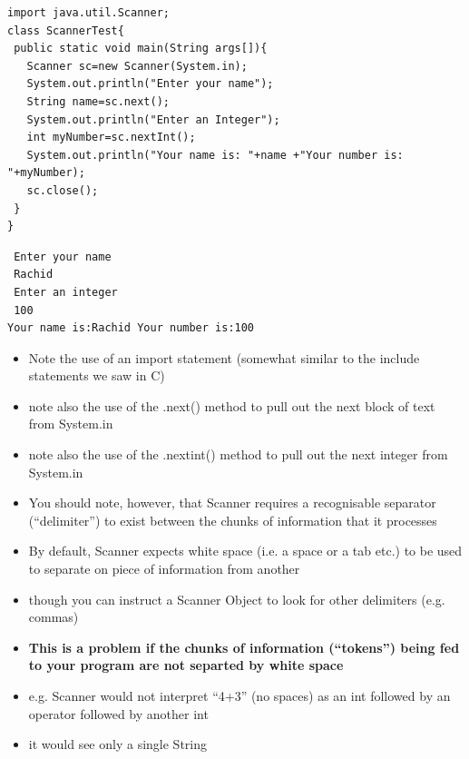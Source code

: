 \documentclass{beamer}
\begin{document}
\begin{frame}[fragile]
\begin{block}{}
\begin{lstlisting}
import java.util.Scanner;  
class ScannerTest{  
 public static void main(String args[]){  
   Scanner sc=new Scanner(System.in);  
   System.out.println("Enter your name"); 
   String name=sc.next();  
   System.out.println("Enter an Integer");  
   int myNumber=sc.nextInt();  
   System.out.println("Your name is: "+name +"Your number is: "+myNumber);  
   sc.close();  
 }  
}  
\end{lstlisting}
\end{block}
\begin{block}{}
\begin{lstlisting}
 Enter your name
 Rachid
 Enter an integer
 100
Your name is:Rachid Your number is:100
\end{lstlisting}
\end{block}
\begin{itemize}
\item Note the use of an import statement (somewhat similar to the include statements we saw in C)
\item note also the use of the .next() method to pull out the next block of text from System.in
\item note also the use of the .nextint() method to pull out the next integer from System.in
\end{itemize}
\end{frame}

\begin{frame}
\begin{itemize}
\item You should note, however, that Scanner requires a recognisable separator (``delimiter'') to exist between the chunks of information that it processes
\item By default, Scanner expects white space (i.e. a space or a tab etc.) to be used to separate on piece of information from another
\item though you can instruct a Scanner Object to look for other delimiters (e.g. commas)
\item \textbf{This is a problem if the chunks of information (``tokens'') being fed to your program are not separted by white space}
\item e.g. Scanner would not interpret ``4+3'' (no spaces) as an int followed  by an operator followed by another int
\item it would see only a single String
\end{itemize}
\end{frame}
\end{document}
